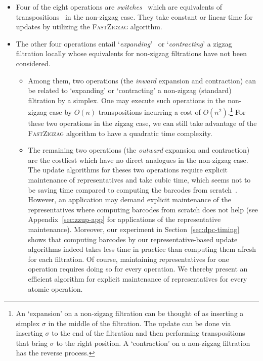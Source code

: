 \documentclass[letterpaper,11pt]{article}
\theoremstyle{mythmstyle}
\theoremstyle{mydefstyle}
\theoremstyle{plain}
\theoremstyle{definition}
\newcommand{\<}[1]{\langle #1\rangle}
\newcommand{\sG}{\sigma}
\begin{document}
\begin{itemize}
    \item Four of the eight operations are 
\emph{switches}~\cite{carlsson2010zigzag,carlsson2019parametrized,carlsson2009zigzag-realvalue,maria2014zigzag,maria2016computing,oudot2015zigzag}
which are equivalents of transpositions~\cite{cohen2006vines} in the non-zigzag case. They take
constant or linear time for updates by utilizing the \textsc{FastZigzag} algorithm. 
    \item The other four operations entail
`\emph{expanding}'~\cite{maria2014zigzag,maria2016computing} or `\emph{contracting}' a zigzag filtration locally 
whose equivalents for non-zigzag filtrations have not been considered.
\begin{itemize}
    \item Among them,
two operations (the \emph{inward} expansion and contraction) 
can be related to `expanding' or `contracting' a non-zigzag (standard) filtration by a simplex. One may execute such operations in the non-zigzag case by $O(n)$ transpositions incurring a cost of $O(n^2)$.\footnote{An `expansion' on a non-zigzag filtration can be thought of as inserting a simplex $\sG$ in the middle
of the filtration. The update can be done via inserting $\sG$ to the end
of the filtration and then performing transpositions that
bring $\sG$ to the right position.
A `contraction' on a non-zigzag filtration has the reverse process.}
For these two operations in the zigzag case, we
can still take advantage of the \textsc{FastZigzag} algorithm to have a quadratic time complexity.
    \item The remaining two operations (the \emph{outward} expansion and contraction) are the costliest
which have no direct analogues in the non-zigzag case.
The update algorithms for theses two operations 
require explicit maintenance of representatives
and take cubic time, 
which seems not to be saving time compared to computing the barcodes from scratch~\cite{carlsson2009zigzag-realvalue,dey2022fast,maria2014zigzag,maria2016computing,maria2019discrete}. However, an application
may demand explicit maintenance of the representatives where computing barcodes
from scratch does not help
(see Appendix~\ref{sec:zzup-app} for applications of the representative maintenance). Moreover, our experiment in Section~\ref{sec:dpc-timing} shows that
computing barcodes by our representative-based update algorithms indeed takes less time in practice than computing them afresh for each filtration. Of course, maintaining representatives for one operation requires doing so for every operation. We thereby present an efficient algorithm for explicit maintenance of representatives for every atomic operation.
\end{itemize}

\end{itemize}
\end{document}
